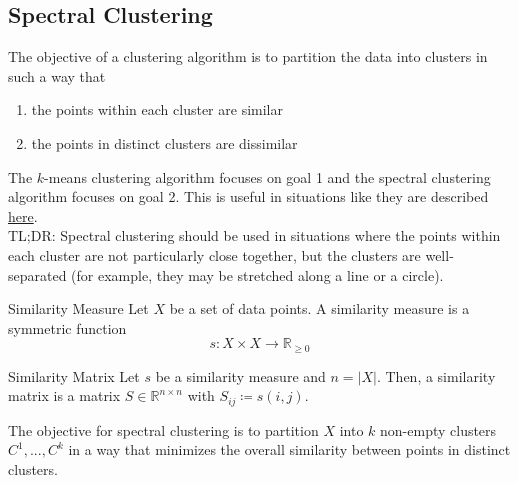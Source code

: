 \documentclass[english]{panikzettel}
\begin{document}
\subsection{Spectral Clustering}
The objective of a clustering algorithm is to partition the data into clusters in such a way that
\begin{enumerate}
\item the points within each cluster are similar
\item the points in distinct clusters are dissimilar
\end{enumerate}

The $k$-means clustering algorithm focuses on goal 1 and the spectral clustering algorithm focuses on goal 2. This is useful in situations like they are described \href{https://towardsdatascience.com/spectral-clustering-82d3cff3d3b7}{here}.\\
TL;DR: Spectral clustering should be used in situations where the points within each cluster are not particularly close together, but the clusters are well-separated (for example, they may be stretched along a line or a circle).\\

\begin{halfboxl}
\vspace{-\baselineskip}
	\begin{defi}{Similarity Measure}
		Let $X$ be a set of data points. A similarity measure is a symmetric function
		\[
		s:X\times X\rightarrow\mathbb{R}_{\geq 0}
		\]
	\end{defi}
\end{halfboxl}
\begin{halfboxr}
\vspace{-\baselineskip}

	\begin{defi}{Similarity Matrix}
		Let $s$ be a similarity measure and $n=|X|$. Then, a similarity matrix is a matrix $S\in\mathbb{R}^{n\times n}$ with $S_{ij}\coloneqq s(i,j)$.
	\end{defi}
	
\end{halfboxr}

The objective for spectral clustering is to partition $X$ into $k$ non-empty clusters $C^1,...,C^k$ in a way that minimizes the overall similarity between points in distinct clusters.
\end{document}

